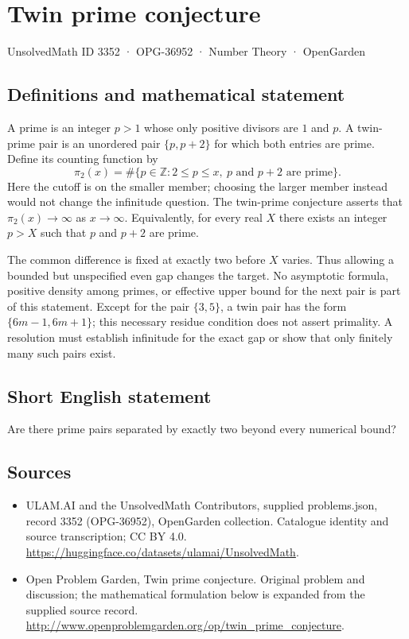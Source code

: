 \documentclass[11pt,a4paper]{article}
\begin{document}
\section*{Twin prime conjecture}\label{3352}
{\small UnsolvedMath ID 3352 · OPG-36952 · Number Theory · OpenGarden}
\subsection{Definitions and mathematical statement}
A prime is an integer $p>1$ whose only positive divisors are $1$ and $p$.
A twin-prime pair is an unordered pair $\{p,p+2\}$ for which both
entries are prime. Define its counting function by
\[
 \pi_2(x)=\#\{p\in\mathbb Z:2\le p\le x,
                           \ p\text{ and }p+2\text{ are prime}\}.
\]
Here the cutoff is on the smaller member; choosing the larger member
instead would not change the infinitude question. The twin-prime
conjecture asserts that $\pi_2(x)\to\infty$ as $x\to\infty$.
Equivalently, for every real $X$ there exists an integer $p>X$ such
that $p$ and $p+2$ are prime.

The common difference is fixed at exactly two before $X$ varies. Thus
allowing a bounded but unspecified even gap changes the target.
No asymptotic formula, positive density among primes, or effective
upper bound for the next pair is part of this statement. Except for
the pair $\{3,5\}$, a twin pair has the form $\{6m-1,6m+1\}$; this
necessary residue condition does not assert primality. A resolution
must establish infinitude for the exact gap or show that only finitely
many such pairs exist.
\subsection{Short English statement}
Are there prime pairs separated by exactly two beyond every numerical bound?
\subsection{Sources}
\begin{itemize}
\item[S1] ULAM.AI and the UnsolvedMath Contributors, supplied problems.json, record 3352 (OPG-36952), OpenGarden collection. Catalogue identity and source transcription; CC BY 4.0.
\url{https://huggingface.co/datasets/ulamai/UnsolvedMath}.
\item[S2] Open Problem Garden, Twin prime conjecture. Original problem and discussion; the mathematical formulation below is expanded from the supplied source record.
\url{http://www.openproblemgarden.org/op/twin_prime_conjecture}.
\end{itemize}
\end{document}
